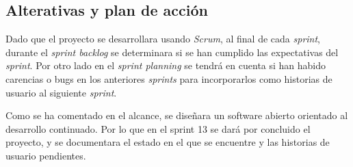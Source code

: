 \documentclass[12pt]{article} %
\begin{document}
\subsection{Alterativas y plan de acción}
Dado que el proyecto se desarrollara usando \textit{Scrum}, al final de cada \textit{sprint}, durante el \textit{sprint backlog} se determinara si se han  
cumplido las expectativas del \textit{sprint}. Por otro lado en el \textit{sprint planning} se tendrá en cuenta si han habido carencias o bugs en los anteriores \textit{sprints} para incorporarlos como historias de usuario al siguiente \textit{sprint}. 

Como se ha comentado en el alcance, se diseñara un software abierto orientado al desarrollo continuado. Por lo que en el sprint 13 se dará por concluido el proyecto, y se documentara el estado en el que se encuentre y las historias de usuario pendientes.
\end{document}
